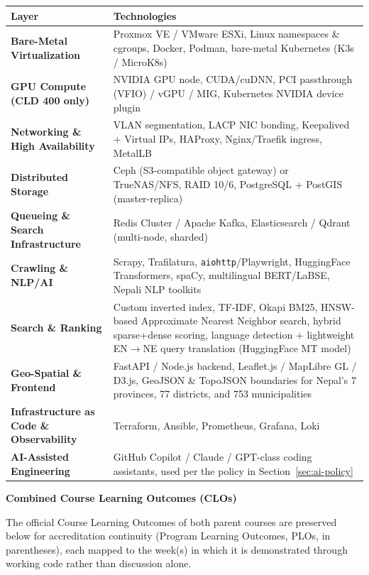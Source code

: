 \documentclass[10pt, a4paper]{article}
\newcommand{\sectionbar}[1]{%
  \par\vspace{0.7em}
  \refstepcounter{section}%
  \noindent\colorbox{secondary}{\parbox{\dimexpr\textwidth-2\fboxsep\relax}{\centering\color{white}\bfseries\Large #1}}%
  \par\vspace{0.5em}
}
\begin{document}
\begin{table}[H]
\centering
\small
\renewcommand{\arraystretch}{1.25}
\begin{tabularx}{\textwidth}{|>{\bfseries}l|X|}
\hline
\rowcolor{lightgray}
Layer & Technologies \\ \hline
Bare-Metal Virtualization & Proxmox VE / VMware ESXi, Linux namespaces \& cgroups, Docker, Podman, bare-metal Kubernetes (K3s / MicroK8s) \\ \hline
GPU Compute (CLD 400 only) & NVIDIA GPU node, CUDA/cuDNN, PCI passthrough (VFIO) / vGPU / MIG, Kubernetes NVIDIA device plugin \\ \hline
Networking \& High Availability & VLAN segmentation, LACP NIC bonding, Keepalived + Virtual IPs, HAProxy, Nginx/Traefik ingress, MetalLB \\ \hline
Distributed Storage & Ceph (S3-compatible object gateway) or TrueNAS/NFS, RAID 10/6, PostgreSQL + PostGIS (master-replica) \\ \hline
Queueing \& Search Infrastructure & Redis Cluster / Apache Kafka, Elasticsearch / Qdrant (multi-node, sharded) \\ \hline
Crawling \& NLP/AI & Scrapy, Trafilatura, \texttt{aiohttp}/Playwright, HuggingFace Transformers, spaCy, multilingual BERT/LaBSE, Nepali NLP toolkits \\ \hline
Search \& Ranking & Custom inverted index, TF-IDF, Okapi BM25, HNSW-based Approximate Nearest Neighbor search, hybrid sparse+dense scoring, language detection + lightweight EN$\to$NE query translation (HuggingFace MT model) \\ \hline
Geo-Spatial \& Frontend & FastAPI / Node.js backend, Leaflet.js / MapLibre GL / D3.js, GeoJSON \& TopoJSON boundaries for Nepal's 7 provinces, 77 districts, and 753 municipalities \\ \hline
Infrastructure as Code \& Observability & Terraform, Ansible, Prometheus, Grafana, Loki \\ \hline
AI-Assisted Engineering & GitHub Copilot / Claude / GPT-class coding assistants, used per the policy in Section~\ref{sec:ai-policy} \\ \hline
\end{tabularx}
\end{table}

\sectionbar{Combined Course Learning Outcomes (CLOs)}
The official Course Learning Outcomes of both parent courses are preserved below for accreditation continuity (Program Learning Outcomes, PLOs, in parentheses), each mapped to the week(s) in which it is demonstrated through working code rather than discussion alone.
\end{document}
